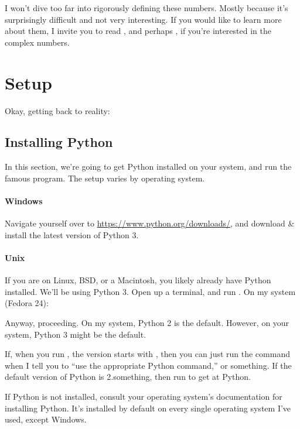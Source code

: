I won't dive too far into rigorously defining these numbers. Mostly
because it's surprisingly difficult and not very interesting. If you
would like to learn more about them, I invite you to read
\cite{landau-fnds}, and perhaps \cite{flanigan-complex-vars}, if
you're interested in the complex numbers.

\section{Setup}

Okay, getting back to reality:

\subsection{Installing Python}

In this section, we're going to get Python installed on your system,
and run the famous  program. The setup varies by
operating system.

\paragraph{Windows}

Navigate yourself over to \url{https://www.python.org/downloads/}, and
download \& install the latest version of Python 3. 

\paragraph{Unix}

If you are on Linux, BSD, or a Macintosh, you likely already have
Python installed. We'll be using Python 3. Open up a terminal, and run
. On my system (Fedora 24):



Anyway, proceeding. On my system, Python 2 is the default. However, on
your system, Python 3 might be the default.



If, when you run , the version starts with
, then you can just run the  command when I tell
you to ``use the appropriate Python command,'' or something. If the
default version of Python is 2.something, then run  to
get at Python.

If Python is not installed, consult your operating system's
documentation for installing Python. It's installed by default on
every single operating system I've used, except Windows.

